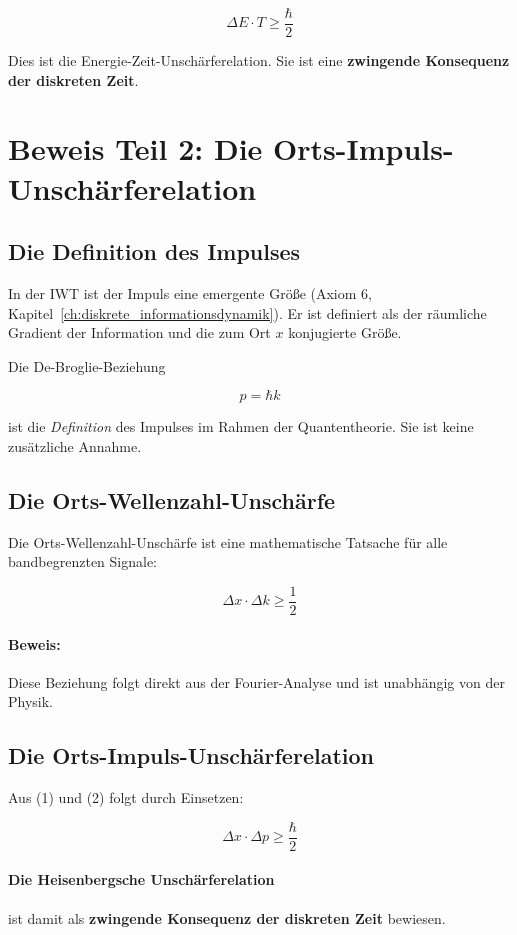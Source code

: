 \[
\Delta E \cdot T \ge \frac{\hbar}{2}
\]

Dies ist die Energie-Zeit-Unschärferelation. Sie ist eine \textbf{zwingende Konsequenz der diskreten Zeit}.

\section{Beweis Teil 2: Die Orts-Impuls-Unschärferelation}
\label{app:unschaerfe_ort_impuls}

\subsection{Die Definition des Impulses}

In der IWT ist der Impuls eine emergente Größe (Axiom 6, Kapitel~\ref{ch:diskrete_informationsdynamik}). Er ist definiert als der räumliche Gradient der Information und die zum Ort $x$ konjugierte Größe.

Die De-Broglie-Beziehung

\[
p = \hbar k
\]

ist die \emph{Definition} des Impulses im Rahmen der Quantentheorie. Sie ist keine zusätzliche Annahme.

\subsection{Die Orts-Wellenzahl-Unschärfe}

Die Orts-Wellenzahl-Unschärfe ist eine mathematische Tatsache für alle bandbegrenzten Signale:

\[
\Delta x \cdot \Delta k \ge \frac{1}{2}
\]

\paragraph{Beweis:} Diese Beziehung folgt direkt aus der Fourier-Analyse und ist unabhängig von der Physik.

\subsection{Die Orts-Impuls-Unschärferelation}

Aus (1) und (2) folgt durch Einsetzen:

\[
\Delta x \cdot \Delta p \ge \frac{\hbar}{2}
\]

\paragraph{Die Heisenbergsche Unschärferelation} ist damit als \textbf{zwingende Konsequenz der diskreten Zeit} bewiesen.

